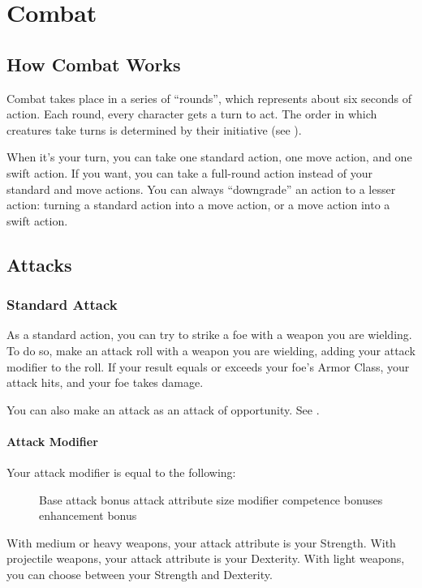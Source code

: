 \chapter{Combat}\label{Combat}

\section{How Combat Works}
Combat takes place in a series of ``rounds'', which represents about six seconds of action. Each round, every character gets a turn to act. The order in which creatures take turns is determined by their initiative (see ). 

When it's your turn, you can take one standard action, one move action, and one swift action. If you want, you can take a full-round action instead of your standard and move actions. You can always ``downgrade'' an action to a lesser action: turning a standard action into a move action, or a move action into a swift action.

\section{Attacks}

\subsection{Standard Attack}
As a standard action, you can try to strike a foe with a weapon you are wielding. To do so, make an attack roll with a weapon you are wielding, adding your attack modifier to the roll. If your result equals or exceeds your foe's Armor Class, your attack hits, and your foe takes damage.

You can also make an attack as an attack of opportunity. See . 

\subsubsection{Attack Modifier}
Your attack modifier is equal to the following:

\begin{figure}[h]
\centering Base attack bonus \add attack attribute \add size modifier \add competence bonuses \add enhancement bonus
\end{figure}

With medium or heavy weapons, your attack attribute is your Strength. With projectile weapons, your attack attribute is your Dexterity. With light weapons, you can choose between your Strength and Dexterity. 

